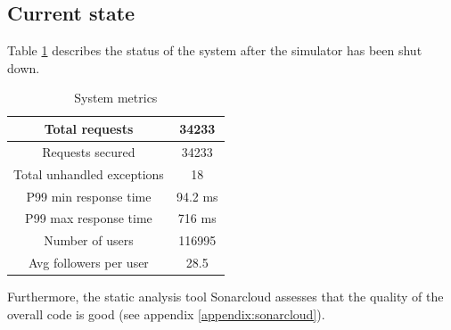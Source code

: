 \subsection{Current state}
Table \ref{current-table} describes the status of the system after the simulator has been shut down.
\begin{table}[H]
    \begin{center}
        \begin{tabular}{ |c|c| }
            \hline
            Total requests & 34233 \\
            \hline
            Requests secured & 34233 \\
            \hline
            Total unhandled exceptions & 18 \\
            \hline
            P99 min response time & 94.2 ms \\
            \hline
            P99 max response time & 716 ms \\
            \hline
            Number of users &  116995\\
            \hline
            Avg followers per user &  28.5\\
            \hline
        \end{tabular}
    \end{center}
    \caption{System metrics}
    \label{current-table}
\end{table}
Furthermore, the static analysis tool Sonarcloud assesses that the quality of the overall code is good (see appendix \ref{appendix:sonarcloud}).
